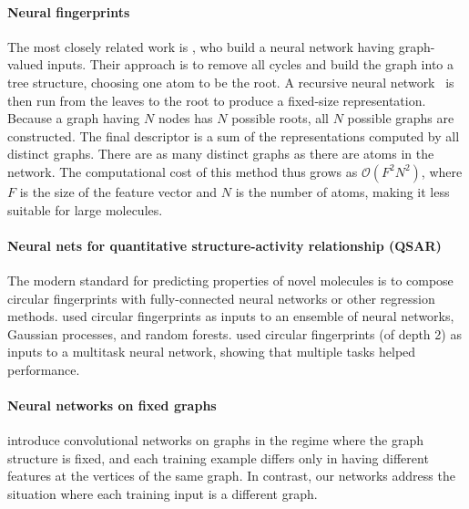 \documentclass{article}
\begin{document}
\paragraph{Neural fingerprints}
The most closely related work is \citet{lusci2013deep}, who build a neural network having graph-valued inputs.
Their approach is to remove all cycles and build the graph into a tree structure, choosing one atom to be the root.
A recursive neural network~\citep{socher2011dynamic, socher2011semi} is then run from the leaves to the root to produce a fixed-size representation.
Because a graph having $N$ nodes has $N$ possible roots, all $N$ possible graphs are constructed.
The final descriptor is a sum of the representations computed by all distinct graphs.
There are as many distinct graphs as there are atoms in the network.
The computational cost of this method thus grows as $\mathcal{O}(F^2N^2)$, where $F$ is the size of the feature vector and $N$ is the number of atoms, making it less suitable for large molecules.

\paragraph{Neural nets for quantitative structure-activity relationship (QSAR)}
The modern standard for predicting properties of novel molecules is to compose circular fingerprints with fully-connected neural networks or other regression methods.
\cite{dahl2014multi} used circular fingerprints as inputs to an ensemble of neural networks, Gaussian processes, and random forests.
\cite{ramsundar2015massively} used circular fingerprints (of depth 2) as inputs to a multitask neural network, showing that multiple tasks helped performance.


\paragraph{Neural networks on fixed graphs}
\cite{bruna2013spectral} introduce convolutional networks on graphs in the regime where the graph structure is fixed, and each training example differs only in having different features at the vertices of the same graph.
In contrast, our networks address the situation where each training input is a different graph.
\end{document}
